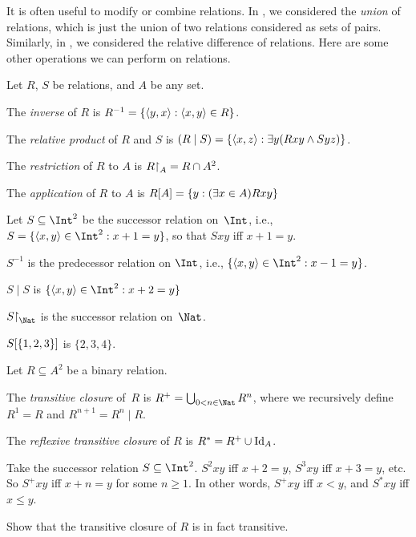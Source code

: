 \documentclass[../../../include/open-logic-section]{subfiles}
\begin{document}

It is often useful to modify or combine relations. In
, we considered the \emph{union}
of relations, which is just the union of two relations considered as
sets of pairs. Similarly, in ,
we considered the relative difference of relations. Here are some
other operations we can perform on relations.

\begin{defn} 
Let $R$, $S$ be relations, and $A$ be any set. 

The \emph{inverse} of $R$ is $R^{-1} = \{ \langle y, x \rangle : \langle x,
    y \rangle \in R \}$.

The \emph{relative product} of $R$ and $S$ is $(R \mid S) =
\{\langle x, z \rangle : \exists y(Rxy \land Syz)\}$.

The \emph{restriction} of $R$ to $A$ is $R\mathord{\restriction}_{A}= R
\cap A^2$.

The \emph{application} of $R$ to $A$ is $R[A] = \{y :
(\exists x \in A)Rxy\}$
\end{defn}

\begin{ex}
Let $S \subseteq \Int^2$ be the successor relation on~$\Int$, i.e.,
$S = \Setabs{\tuple{x, y} \in \Int^2}{x + 1 = y}$, so that $Sxy$ iff $x + 1 = y$.

$S^{-1}$ is the predecessor relation on $\Int$, i.e.,
$\Setabs{\tuple{x,y}\in\Int^2}{x -1 =y}$.

$S\mid S$ is 
$ \Setabs{\tuple{x,y}\in\Int^2}{x + 2 =y}$

$\funrestrictionto{S}{\Nat}$ is the successor relation on~$\Nat$.

$S[\{1,2,3\}]$ is $\{2, 3, 4\}$.
\end{ex}

\begin{defn}Let $R \subseteq A^2$ be a binary relation. 
	
The \emph{transitive closure} of~$R$ is $R^+ = \bigcup_{0 < n \in
\Nat} R^n$, where we recursively define $R^1 = R$ and $R^{n+1} = R^n
\mid R$.

The \emph{reflexive transitive closure} of $R$ is $R^* = R^+ \cup
\mathord{\mathrm{Id}_{A}}$.
\end{defn}

\begin{ex}
Take the successor relation $S \subseteq \Int^2$. $S^2xy$ iff $x + 2 =
y$, $S^3xy$ iff $x + 3 = y$, etc. So $S^+xy$ iff $x + n = y$ for some
$n \geq 1$. In other words, $S^+xy$ iff $x < y$, and $S^*xy$ iff $x \le
y$.
\end{ex}

\begin{prob}
Show that the transitive closure of $R$ is in fact transitive.
\end{prob}
\end{document}
